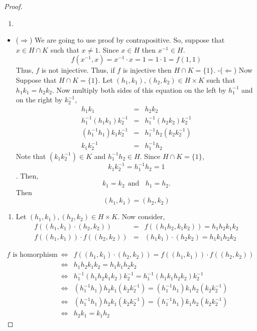 \documentclass[
]{book}
\providecommand{\tightlist}{%
  \setlength{\itemsep}{0pt}\setlength{\parskip}{0pt}}
\theoremstyle{definition}
\theoremstyle{definition}
\theoremstyle{definition}
\theoremstyle{definition}
\theoremstyle{remark}
\begin{document}
\begin{proof}
\leavevmode

\begin{enumerate}
\def\labelenumi{\alph{enumi}.}
\tightlist
\item
\end{enumerate}

\begin{itemize}
\tightlist
\item
  (\(\Longrightarrow\)) We are going to use proof by contrapositive. So, suppose that \(x\in H\cap K\) such that \(x \neq 1\). Since \(x\in H\) then \(x^{-1} \in H\).
  \[f(x^{-1},x)=x^{-1}\cdot x=1=1\cdot 1=f(1,1)\]
  Thus, \(f\) is not injective. Thus, if \(f\) is injective then \(H \cap K = \{1\}\).
  -(\(\Longleftarrow\))
  Now Suppose that \(H \cap K = \{1\}\). Let \((h_1, k_1),(h_2, k_2)\in H \times K\) such that \(h_1k_1 = h_2k_2\). Now multiply both sides of this equation on the left by \(h_1^{-1}\) and on the right by \(k_2^{-1}\),
  \begin{eqnarray}
  h_1k_1 &=& h_2k_2\\
  h_1^{-1}(h_1k_1)k_2^{-1} &=& h_1^{-1}(h_2k_2)k_2^{-1}\\
  (h_1^{-1}h_1)k_1k_2^{-1} &=& h_1^{-1}h_2(k_2k_2^{-1})\\
  k_1k_2^{-1} &=& h_1^{-1}h_2
  \end{eqnarray}
  Note that \((k_1k_2^{-1})\in K\) and \(h_1^{-1}h_2\in H\). Since \(H \cap K = \{1\}\), \[k_1k_2^{-1} = h_1^{-1}h_2 = 1\]. Then,
  \[
  k_1=k_2~~\text{and}~~~~h_1=h_2.
  \]
  Then \[(h_1, k_1) = (h_2, k_2)\]
\end{itemize}

\begin{enumerate}
\def\labelenumi{\alph{enumi}.}
\setcounter{enumi}{1}
\tightlist
\item
  Let \((h_1, k_1),(h_2, k_2)\in H \times K\). Now consider,
  \begin{eqnarray}
  f((h_1,k_1)\cdot (h_2,k_2))&=&f((h_1h_2,k_1k_2))=h_1h_2k_1k_2\\
  f((h_1,k_1))\cdot f((h_2,k_2))&=& (h_1k_1)\cdot(h_2k_2)=h_1k_1h_2k_2
  \end{eqnarray}
\end{enumerate}

\begin{eqnarray}
f\text{ is homorphism} &\iff & 
f((h_1,k_1)\cdot (h_2,k_2))=f((h_1,k_1))\cdot f((h_2,k_2))\\
&\iff & h_1h_2k_1k_2=h_1k_1h_2k_2\\
&\iff & h_1^{-1}(h_1h_2k_1k_2)k_2^{-1}=h_1^{-1}(h_1k_1h_2k_2)k_2^{-1}\\
&\iff & (h_1^{-1}h_1)h_2k_1(k_2k_2^{-1})=(h_1^{-1}h_1)k_1h_2(k_2k_2^{-1})\\
&\iff & (h_1^{-1}h_1)h_2k_1(k_2k_2^{-1})=(h_1^{-1}h_1)k_1h_2(k_2k_2^{-1})\\
&\iff & h_2k_1=k_1h_2
\end{eqnarray}


\end{proof}
\end{document}
